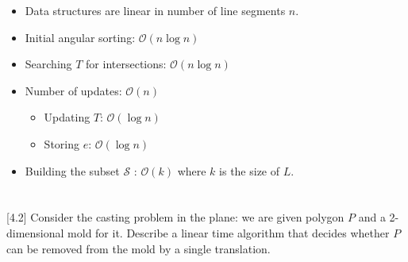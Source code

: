\documentclass[11pt]{article}
\newenvironment{Quest}{ \begin{framed}} {\end{framed}  \vspace{0.2 cm}}
\begin{document}
\begin{enumerate}[1.]
    \begin{itemize}
        \item Data structures are linear in number of line segments $n$.
        \item Initial angular sorting: $\mathcal{O}(n \log n)$
        \item Searching $T$ for intersections: $\mathcal{O}(n \log n)$
        \item Number of updates: $\mathcal{O}(n)$
            \begin{itemize}
                \item Updating  $T$: $\mathcal{O}(\log n)$
                \item Storing $e$: $\mathcal{O}(\log n)$
            \end{itemize}
        \item Building the subset $\mathcal{S}$ : $\mathcal{O}(k)$ where $k$ is the size of $L$.
    \end{itemize}
\end{enumerate}

\FloatBarrier
\newpage



















\section{}

\begin{Quest}

[4.2] Consider the casting problem in the plane: we are given polygon $P$ and a 2-dimensional mold for it. Describe a linear time algorithm that decides whether $P$ can be removed from the mold by a single translation.

\end{Quest}
\end{document}
